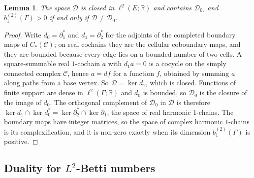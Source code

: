 \documentclass[11pt,a4paper]{article}
\newtheorem{lemma}{Lemma}[section]
\theoremstyle{definition}
\theoremstyle{remark}
\newcommand{\R}{\mathbb{R}}
\newcommand{\Gam}{\Gamma}
\newcommand{\lt}{\ell^2}
\newcommand{\bt}[1]{b^{(2)}_{#1}}
\newcommand{\Dsp}{\mathcal{D}}
\newcommand{\Cay}{\mathcal{C}}
\begin{document}
\begin{lemma}\label{lem:gradient}
The space $\Dsp$ is closed in $\lt(E;\R)$ and contains $\Dsp_0$, and $\bt{1}(\Gam)>0$ if
and only if $\Dsp\ne\Dsp_0$.
\end{lemma}
\begin{proof}
Write $d_0=\partial_1^*$ and $d_1=\partial_2^*$ for the adjoints of the completed
boundary maps of $C_*(\Cay)$; on real cochains they are the cellular coboundary
maps, and they are bounded because every edge lies on a bounded number of
two-cells. A square-summable real $1$-cochain $a$ with $d_1a=0$ is a cocycle on
the simply connected complex $\Cay$, hence $a=df$ for a function $f$, obtained by
summing $a$ along paths from a base vertex. So $\Dsp=\ker d_1$, which is closed.
Functions of finite support are dense in $\lt(\Gam;\R)$ and $d_0$ is bounded, so
$\Dsp_0$ is the closure of the image of $d_0$. The orthogonal complement of $\Dsp_0$
in $\Dsp$ is therefore $\ker d_1\cap\ker d_0^*=\ker\partial_2^*\cap\ker\partial_1$,
the space of real harmonic $1$-chains. The boundary maps have integer matrices,
so the space of complex harmonic $1$-chains is its complexification, and it is
non-zero exactly when its dimension $\bt{1}(\Gam)$ is positive.
\end{proof}

\subsection{Duality for $L^2$-Betti numbers}
\end{document}
